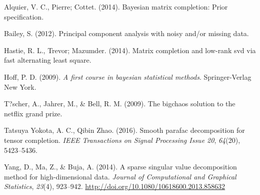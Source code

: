 \documentclass[12pt,twoside]{dukestatscithesis}
\theoremstyle{definition}
\theoremstyle{definition}
\theoremstyle{definition}
\theoremstyle{remark}
\begin{document}
\hypertarget{ref-prior2014}{}
Alquier, V. C., Pierre; Cottet. (2014). Bayesian matrix completion:
Prior specification.

\hypertarget{ref-pca2012}{}
Bailey, S. (2012). Principal component analysis with noisy and/or
missing data.

\hypertarget{ref-fastALS2014}{}
Hastie, R. L., Trevor; Mazumder. (2014). Matrix completion and low-rank
svd via fast alternating least square.

\hypertarget{ref-hoff2009}{}
Hoff, P. D. (2009). \emph{A first course in bayesian statistical
methods}. Springer-Verlag New York.

\hypertarget{ref-netflix2009}{}
T?scher, A., Jahrer, M., \& Bell, R. M. (2009). The bigchaos solution to
the netflix grand prize.

\hypertarget{ref-smoothParafac2016}{}
Tatsuya Yokota, A. C., Qibin Zhao. (2016). Smooth parafac decomposition
for tensor completion. \emph{IEEE Transactions on Signal Processing
Issue 20}, \emph{64}(20), 5423--5436.

\hypertarget{ref-sparse2014}{}
Yang, D., Ma, Z., \& Buja, A. (2014). A sparse singular value
decomposition method for high-dimensional data. \emph{Journal of
Computational and Graphical Statistics}, \emph{23}(4), 923--942.
\url{http://doi.org/10.1080/10618600.2013.858632}


\end{document}
